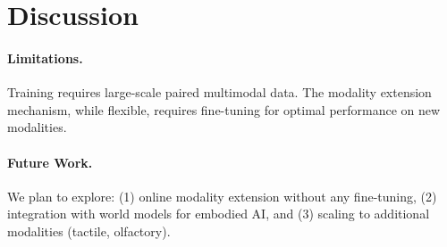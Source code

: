 \section{Discussion}


\paragraph{Limitations.} Training requires large-scale paired multimodal data. The modality extension mechanism, while flexible, requires fine-tuning for optimal performance on new modalities.

\paragraph{Future Work.} We plan to explore: (1) online modality extension without any fine-tuning, (2) integration with world models for embodied AI, and (3) scaling to additional modalities (tactile, olfactory).

